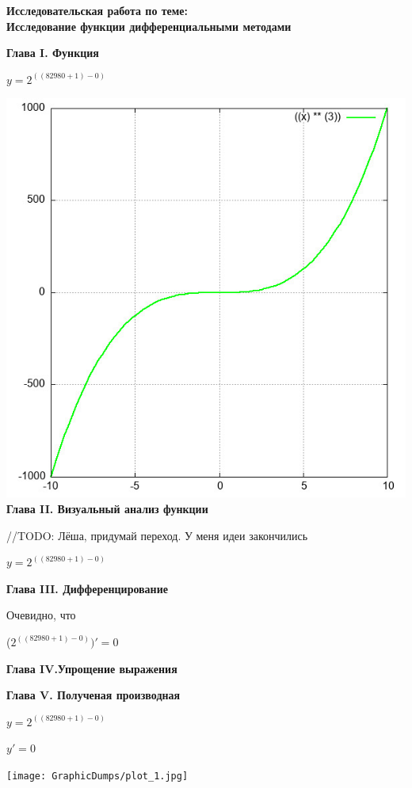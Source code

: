 \documentclass[12pt,a4paper,fleqn]{article}
\begin{document}
\begin{center}
\textbf{\LARGE{Исследовательская работа по теме:\\Исследование функции дифференциальными методами}}\end{center}\newpage\textbf{\LARGE Глава I. Функция}

\begin{center}
$y = $$2^{((82980+1)-0)}$

\end{center}
\includegraphics{GraphicDumps/plot.jpg}\newpage \textbf{\LARGE Глава II. Визуальный анализ функции}

//TODO: Лёша, придумай переход. У меня идеи закончились

\begin{center}
$y = $$2^{((82980+1)-0)}$

\end{center}
\newpage \textbf{\LAGRE Глава III. Дифференцирование}

Очевидно, что

\begin{center}
 ($2^{((82980+1)-0)})'
  = 0$\end{center}
\newpage \textbf{\LARGE Глава IV.Упрощение выражения}

\newpage \textbf{\LARGE Глава V. Полученая производная}

$y = $$2^{((82980+1)-0)}$

$y' = $$0$

\texttt{[image: GraphicDumps/plot\_1.jpg]}
\end{document}

